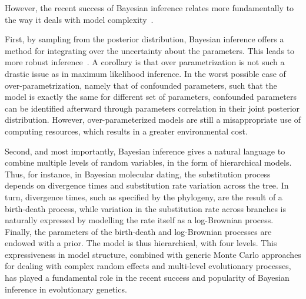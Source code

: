 However, the recent success of Bayesian inference relates more fundamentally to the way it deals with model complexity~\citep{Huelsenbeck2000a,Lartillot2020}.

First, by sampling from the posterior distribution, Bayesian inference offers a method for integrating over the uncertainty about the parameters.
This leads to more robust inference~\citep{Huelsenbeck2000a}.
A corollary is that over parametrization is not such a drastic issue as in maximum likelihood inference.
In the worst possible case of over-parametrization, namely that of confounded parameters, such that the model is exactly the same for different set of parameters, confounded parameters can be identified afterward through parameters correlation in their joint posterior distribution.
However, over-parameterized models are still a misappropriate use of computing resources, which results in a greater environmental cost.

Second, and most importantly, Bayesian inference gives a natural language to combine multiple levels of random variables, in the form of hierarchical models.
Thus, for instance, in Bayesian molecular dating, the substitution process depends on divergence times and substitution rate variation across the tree.
In turn, divergence times, such as specified by the phylogeny, are the result of a birth-death process, while variation in the substitution rate across branches is naturally expressed by modelling the rate itself as a log-Brownian process.
Finally, the parameters of the birth-death and log-Brownian processes are endowed with a prior.
The model is thus hierarchical, with four levels.
This expressiveness in model structure, combined with generic Monte Carlo approaches for dealing with complex random effects and multi-level evolutionary processes, has played a fundamental role in the recent success and popularity of Bayesian inference in evolutionary genetics.


